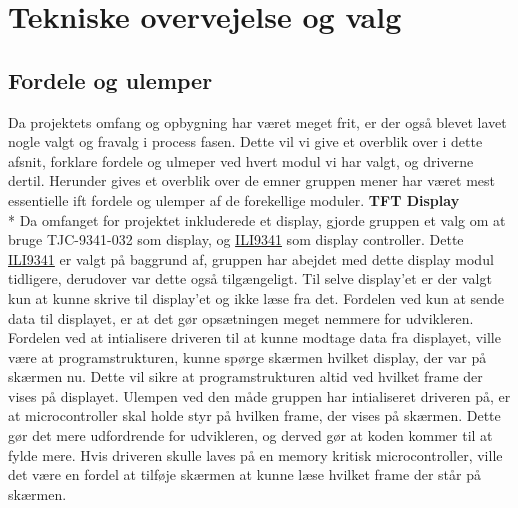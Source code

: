 \graphicspath{{Chapters/Alternative/}}


\section{Tekniske overvejelse og valg}



\subsection{Fordele og ulemper}
Da projektets omfang og opbygning har været meget frit, er der også blevet lavet nogle valgt og fravalg i process fasen. Dette vil vi give et overblik over i dette afsnit, forklare fordele og ulmeper ved hvert modul vi har valgt, og driverne dertil. Herunder gives et overblik over de emner gruppen mener har været mest essentielle ift fordele og ulemper af de forekellige moduler. 
\newline
\newline
\textbf{TFT Display} \\*
Da omfanget for projektet inkluderede et display, gjorde gruppen et valg om at bruge TJC-9341-032 som display, og \href{https://blackboard.au.dk/bbcswebdav/pid-1697983-dt-content-rid-3847230_1/courses/BB-Cou-UUVA-73302/BB-Cou-UUVA-65758_ImportedContent_20170106021228/BB-Cou-STADS-UUVA-52360_ImportedContent_20160107025559/LAB/Lab3a%20Graphic%20LCD%20Display/Files%20for%20LAB3a/ILI9341_v1.11.pdf}{ILI9341} 
som display controller. Dette \href{https://blackboard.au.dk/bbcswebdav/pid-1697983-dt-content-rid-3847230_1/courses/BB-Cou-UUVA-73302/BB-Cou-UUVA-65758_ImportedContent_20170106021228/BB-Cou-STADS-UUVA-52360_ImportedContent_20160107025559/LAB/Lab3a%20Graphic%20LCD%20Display/Files%20for%20LAB3a/ILI9341_v1.11.pdf}{ILI9341} 
er valgt på baggrund af, gruppen har abejdet med dette display modul tidligere, derudover var dette også tilgængeligt.
Til selve display'et er der valgt kun at kunne skrive til display'et og ikke læse fra det. Fordelen ved kun at sende data til displayet, er at det gør opsætningen meget nemmere for udvikleren. \\
Fordelen ved at intialisere driveren til at kunne modtage data fra displayet, ville være at programstrukturen, kunne spørge skærmen hvilket display, der var på skærmen nu. Dette vil sikre at programstrukturen altid ved hvilket frame der vises på displayet. Ulempen ved den måde gruppen har intialiseret driveren på, er at microcontroller skal holde styr på hvilken frame, der vises på skærmen. Dette gør det mere udfordrende for udvikleren, og derved gør at koden kommer til at fylde mere. Hvis driveren skulle laves på en memory kritisk microcontroller, ville det være en fordel at tilføje skærmen at kunne læse hvilket frame der står på skærmen. \\
